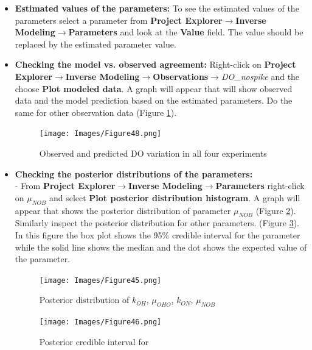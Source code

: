 \begin{itemize}
\item \textbf{Estimated values of the parameters: } To see the estimated values of the parameters select a parameter from \textbf{Project Explorer}$\rightarrow$\textbf{Inverse Modeling}$\rightarrow$\textbf{Parameters} and look at the \textbf{Value} field. The value should be replaced by the estimated parameter value. 

\item \textbf{Checking the model vs. observed agreement: } Right-click on \textbf{Project Explorer}$\rightarrow$\textbf{Inverse Modeling}$\rightarrow$\textbf{Observations}$\rightarrow$\textit{DO\_nospike} and the choose \textbf{Plot modeled data}. A graph will appear that will show observed data and the model prediction based on the estimated parameters. Do the same for other observation data (Figure \ref{fig:48}).

\begin{figure}[!ht]
\begin{center}
\texttt{[image: Images/Figure48.png]} \\
\caption{Observed and predicted DO variation in all four experiments}\label{fig:48}
\end{center}
\end{figure}  



\item \textbf{Checking the posterior distributions of the parameters: }\\ - From \textbf{Project Explorer}$\rightarrow$\textbf{Inverse Modeling}$\rightarrow$\textbf{Parameters} right-click on $\mu_{NOB}$ and select \textbf{Plot posterior distribution histogram}. A graph will appear that shows the posterior distribution of parameter $\mu_{NOB}$ (Figure \ref{fig:45}). Similarly inspect the posterior distribution for other parameters. (Figure \ref{fig:46}). In this figure the box plot shows the 95\% credible interval for the parameter while the solid line shows the median and the dot shows the expected value of the parameter. 

\begin{figure}[!ht]
\begin{center}
\texttt{[image: Images/Figure45.png]} \\
\caption{Posterior distribution of $k_{OH}$,  $\mu_{OHO}$, $k_{ON}$,  $\mu_{NOB}$}\label{fig:45}
\end{center}
\end{figure}  


\begin{figure}[!ht]
\begin{center}
\texttt{[image: Images/Figure46.png]} \\
\caption{Posterior credible interval for }\label{fig:46}
\end{center}
\end{figure}  



\end{itemize}
